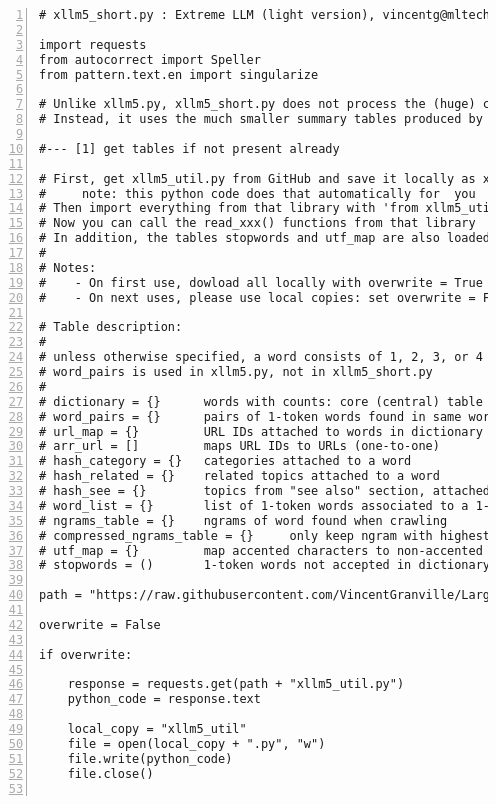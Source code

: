 \documentclass[oneside,10pt]{book}
\begin{document}
\begin{lstlisting}[numbers=left]
# xllm5_short.py : Extreme LLM (light version), vincentg@mltechniques.com

import requests
from autocorrect import Speller
from pattern.text.en import singularize

# Unlike xllm5.py, xllm5_short.py does not process the (huge) crawled data.
# Instead, it uses the much smaller summary tables produced by xllm5.py

#--- [1] get tables if not present already

# First, get xllm5_util.py from GitHub and save it locally as xllm5_util.py
#     note: this python code does that automatically for  you
# Then import everything from that library with 'from xllm5_util import *'
# Now you can call the read_xxx() functions from that library
# In addition, the tables stopwords and utf_map are also loaded
#
# Notes:
#    - On first use, dowload all locally with overwrite = True
#    - On next uses, please use local copies: set overwrite = False 

# Table description: 
#
# unless otherwise specified, a word consists of 1, 2, 3, or 4 tokens
# word_pairs is used in xllm5.py, not in xllm5_short.py
#
# dictionary = {}      words with counts: core (central) table
# word_pairs = {}      pairs of 1-token words found in same word, with count
# url_map = {}         URL IDs attached to words in dictionary
# arr_url = []         maps URL IDs to URLs (one-to-one)
# hash_category = {}   categories attached to a word
# hash_related = {}    related topics attached to a word
# hash_see = {}        topics from "see also" section, attached to word
# word_list = {}       list of 1-token words associated to a 1-token word 
# ngrams_table = {}    ngrams of word found when crawling
# compressed_ngrams_table = {}     only keep ngram with highest count
# utf_map = {}         map accented characters to non-accented version
# stopwords = ()       1-token words not accepted in dictionary

path = "https://raw.githubusercontent.com/VincentGranville/Large-Language-Models/main/llm5/"

overwrite = False

if overwrite:

    response = requests.get(path + "xllm5_util.py")
    python_code = response.text

    local_copy = "xllm5_util"
    file = open(local_copy + ".py", "w")
    file.write(python_code)
    file.close()


\end{lstlisting}
\end{document}
